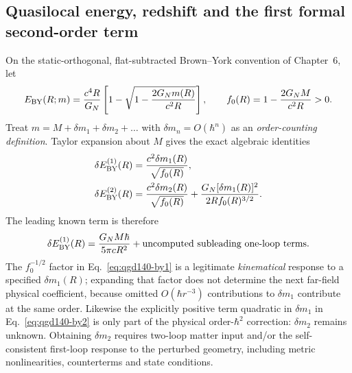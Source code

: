 \documentclass[11pt,a4paper]{article}
\begin{document}
\subsection{Quasilocal energy, redshift and the first formal second-order term}
On the static-orthogonal, flat-subtracted Brown--York convention of
Chapter~6, let
\begin{equation}\label{eq:qgd140-BYfunctional}
 E_{\rm BY}(R;m)=\frac{c^4R}{G_N}
 \left[1-\sqrt{1-\frac{2G_N m(R)}{c^2R}}\right],
 \qquad f_0(R)=1-\frac{2G_NM}{c^2R}>0.
\end{equation}
Treat $m=M+\delta m_1+\delta m_2+\ldots$ with
$\delta m_n=O(\hbar^n)$ as an \emph{order-counting definition}.
Taylor expansion about $M$ gives the exact algebraic identities
\begin{align}
 \delta E_{\rm BY}^{(1)}(R)
 &=\frac{c^2\delta m_1(R)}{\sqrt{f_0(R)}},
 \label{eq:qgd140-by1}\\
 \delta E_{\rm BY}^{(2)}(R)
 &=\frac{c^2\delta m_2(R)}{\sqrt{f_0(R)}}
 +\frac{G_N[\delta m_1(R)]^2}{2R f_0(R)^{3/2}}.
 \label{eq:qgd140-by2}
\end{align}
The leading known term is therefore
\begin{equation}\label{eq:qgd140-BYknown}
 \delta E_{\rm BY}^{(1)}(R)
 =\frac{G_NM\hbar}{5\pi cR^2}
 +\text{uncomputed subleading one-loop terms}.
\end{equation}
The $f_0^{-1/2}$ factor in Eq.~\eqref{eq:qgd140-by1} is a legitimate
\emph{kinematical} response to a specified $\delta m_1(R)$; expanding
that factor does not determine the next far-field physical coefficient,
because omitted $O(\hbar r^{-3})$ contributions to $\delta m_1$ contribute
at the same order. Likewise the explicitly positive term quadratic in
$\delta m_1$ in Eq.~\eqref{eq:qgd140-by2} is only part of the
physical order-$\hbar^2$ correction: $\delta m_2$ remains unknown.
Obtaining $\delta m_2$ requires two-loop matter input and/or the
self-consistent first-loop response to the perturbed geometry,
including metric nonlinearities, counterterms and state conditions.
\end{document}
